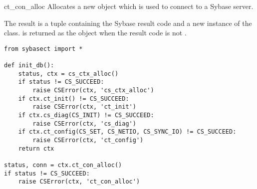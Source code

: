 \begin{methoddesc}[CS_CONTEXT]{ct_con_alloc}{}
Allocates a new  object which is used to connect
to a Sybase server.

The result is a tuple containing the Sybase result code and a new
instance of the  class.  is returned
as the  object when the result code is not
.

\begin{verbatim}
from sybasect import *

def init_db():
    status, ctx = cs_ctx_alloc()
    if status != CS_SUCCEED:
        raise CSError(ctx, 'cs_ctx_alloc')
    if ctx.ct_init() != CS_SUCCEED:
        raise CSError(ctx, 'ct_init')
    if ctx.cs_diag(CS_INIT) != CS_SUCCEED:
        raise CSError(ctx, 'cs_diag')
    if ctx.ct_config(CS_SET, CS_NETIO, CS_SYNC_IO) != CS_SUCCEED:
        raise CSError(ctx, 'ct_config')
    return ctx

status, conn = ctx.ct_con_alloc()
if status != CS_SUCCEED:
    raise CSError(ctx, 'ct_con_alloc')
\end{verbatim}
\end{methoddesc}

